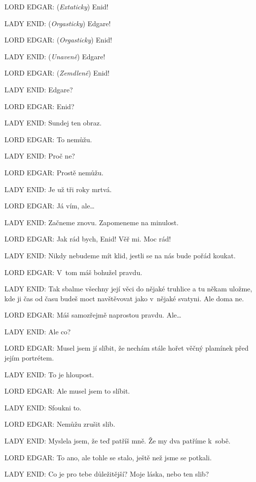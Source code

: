 \noindent
LORD EDGAR: (\textit{Extaticky}) Enid!

\noindent
LADY ENID: (\textit{Orgasticky}) Edgare!

\noindent
LORD EDGAR: (\textit{Orgasticky}) Enid!

\noindent
LADY ENID: (\textit{Unaveně}) Edgare!

\noindent
LORD EDGAR: (\textit{Zemdleně}) Enid!

\noindent
LADY ENID: Edgare?

\noindent
LORD EDGAR: Enid?

\noindent
LADY ENID: Sundej ten obraz.

\noindent
LORD EDGAR: To nemůžu.

\noindent
LADY ENID: Proč ne?

\noindent
LORD EDGAR: Prostě nemůžu.

\noindent
LADY ENID: Je už tři roky mrtvá.

\noindent
LORD EDGAR: Já vím, ale\ldots

\noindent
LADY ENID: Začneme znovu. Zapomeneme na minulost.

\noindent
LORD EDGAR: Jak rád bych, Enid! Věř mi. Moc rád!

\noindent
LADY ENID: Nikdy nebudeme mít klid, jestli se na nás bude pořád koukat.

\noindent
LORD EDGAR: V tom máš bohužel pravdu.

\noindent
LADY ENID: Tak sbalme všechny její věci do nějaké truhlice a tu někam uložme, kde ji čas od času budeš moct navštěvovat jako v nějaké svatyni. Ale doma ne.

\noindent
LORD EDGAR: Máš samozřejmě naprostou pravdu. Ale\ldots

\noindent
LADY ENID: Ale co?

\noindent
LORD EDGAR: Musel jsem jí slíbit, že nechám stále hořet věčný plamínek před jejím portrétem.

\noindent
LADY ENID: To je hloupost.

\noindent
LORD EDGAR: Ale musel jsem to slíbit.

\noindent
LADY ENID: Sfoukni to.

\noindent
LORD EDGAR: Nemůžu zrušit slib.

\noindent
LADY ENID: Myslela jsem, že teď patříš mně. Že my dva patříme k sobě.

\noindent
LORD EDGAR: To ano, ale tohle se stalo, ještě než jsme se potkali.

\noindent
LADY ENID: Co je pro tebe důležitější? Moje láska, nebo ten slib?

